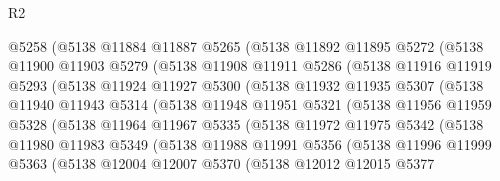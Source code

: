 \begin{lexlean}{R2}
\begin{coremodule}
              @5258
              (@5138
                @11884
                @11887
                @5265
                (@5138
                  @11892
                  @11895
                  @5272
                  (@5138
                    @11900
                    @11903
                    @5279
                    (@5138
                      @11908
                      @11911
                      @5286
                      (@5138
                        @11916
                        @11919
                        @5293
                        (@5138
                          @11924
                          @11927
                          @5300
                          (@5138
                            @11932
                            @11935
                            @5307
                            (@5138
                              @11940
                              @11943
                              @5314
                              (@5138
                                @11948
                                @11951
                                @5321
                                (@5138
                                  @11956
                                  @11959
                                  @5328
                                  (@5138
                                    @11964
                                    @11967
                                    @5335
                                    (@5138
                                      @11972
                                      @11975
                                      @5342
                                      (@5138
                                        @11980
                                        @11983
                                        @5349
                                        (@5138
                                          @11988
                                          @11991
                                          @5356
                                          (@5138
                                            @11996
                                            @11999
                                            @5363
                                            (@5138
                                              @12004
                                              @12007
                                              @5370
                                              (@5138
                                                @12012
                                                @12015
                                                @5377

\end{coremodule}
\end{lexlean}
